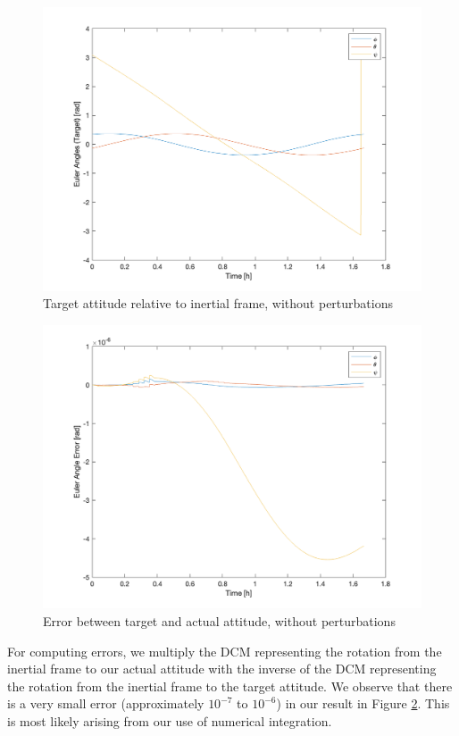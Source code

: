 \begin{figure}[H]
\centering
\includegraphics[scale=0.6]{Images/ps6_problem2_target.png}
\caption{Target attitude relative to inertial frame, without perturbations}
\label{fig:Images/ps6_problem2_target}
\end{figure}

\begin{figure}[H]
\centering
\includegraphics[scale=0.6]{Images/ps6_problem2_error.png}
\caption{Error between target and actual attitude, without perturbations}
\label{fig:Images/ps6_problem2_error}
\end{figure}

For computing errors, we multiply the DCM representing the rotation from the inertial frame to our actual attitude with the inverse of the DCM representing the rotation from the inertial frame to the target attitude. We observe that there is a very small error (approximately $10^{-7}$ to $10^{-6}$) in our result in Figure \ref{fig:Images/ps6_problem2_error}. This is most likely arising from our use of numerical integration.


